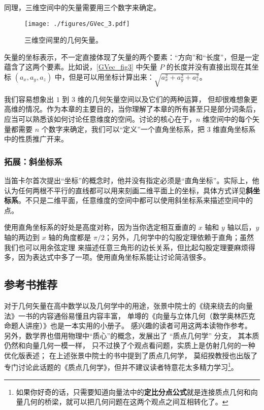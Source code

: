 同理，三维空间中的矢量需要用三个数字来确定。

\begin{figure}[ht]
\centering
\texttt{[image: ./figures/GVec\_3.pdf]}
\caption{三维空间里的几何矢量。} \label{GVec_fig3}
\end{figure}

矢量的坐标表示，不一定直接体现了矢量的两个要素：“方向”和“长度”，但是一定蕴含了这两个要素。比如说，\autoref{GVec_fig3} 中矢量 $P$ 的长度并没有直接出现在其坐标 $(a_x, a_y, a_z)$ 中，但是可以用坐标计算出来：$\sqrt{a_x^2+a_y^2+a_z^2}$。

我们容易想象出 $1$ 到 $3$ 维的几何矢量空间以及它们的两种运算， 但却很难想象更高维的情况。作为本章的主要目的，当你理解了本章的所有甚至只是部分词条后，应当可以熟悉该如何讨论任意维度的空间。讨论的核心在于，$n$ 维空间中的每个矢量都需要 $n$ 个数字来确定，我们可以“定义”一个直角坐标系，把 $3$ 维直角坐标系中的性质推广开来。

\subsubsection{拓展：斜坐标系}

当笛卡尔首次提出“坐标”的概念时，他并没有指定必须是“直角坐标”。实际上，他认为任何两根不平行的直线都可以用来刻画二维平面上的坐标，具体方式详见\textbf{斜坐标系}。不只是二维平面，任意维度的空间中都可以使用斜坐标系来描述空间中的点。

使用直角坐标系的好处是高度对称，因为当你选定相互垂直的 $x$ 轴和 $y$ 轴以后，$y$ 轴的两边到 $x$ 轴的角度都是 $\pi/2$；另外，几何学中的勾股定理依赖于直角；虽然我们也可以用余弦定理%
来描述任意三角形的边长关系，但比起勾股定理要麻烦得多，因为表达式中多了一项。使用直角坐标系能让讨论简洁很多。

\subsection{参考书推荐}
对于几何矢量在高中数学以及几何学中的用途，张景中院士的《绕来绕去的向量法》一书的内容通俗易懂且内容丰富， 单墫的《向量与立体几何（数学奥林匹克命题人讲座）》也是一本实用的小册子。 感兴趣的读者可用这两本读物作参考。 另外，数学界也借用物理中“质心”的概念，发展出了 “质点几何学” 分支， 其本质仍然和向量几何一模一样， 只不过换了个观点看问题，实质上是仿射几何的一种优化版表述； 在上述张景中院士的书中提到了质点几何学， 莫绍揆教授也出版了专门讨论此话题的《质点几何学》，但并不建议读者特意花太多精力学习\footnote{如果你好奇的话，只需要知道向量法中的\textbf{定比分点公式}就是连接质点几何和向量几何的桥梁，就可以把几何问题在这两个观点之间互相转化了。}。
